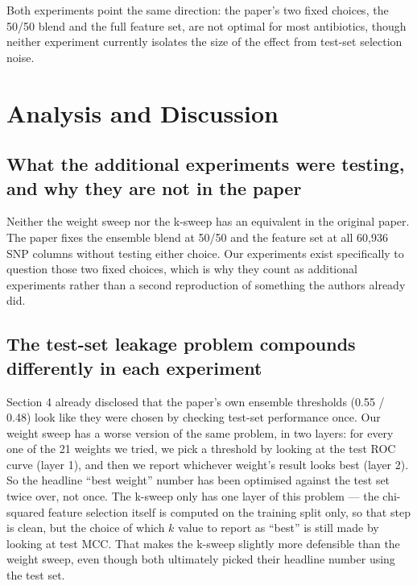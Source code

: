 \documentclass[11pt]{article}
\begin{document}
\bigskip
\noindent Both experiments point the same direction: the paper's two fixed choices, the 50/50 blend and the full feature set, are not optimal for most antibiotics, though neither experiment currently isolates the size of the effect from test-set selection noise.

\section{Analysis and Discussion}

\subsection{What the additional experiments were testing, and why they are not in the paper}

Neither the weight sweep nor the k-sweep has an equivalent in the original paper. The paper fixes the ensemble blend at 50/50 and the feature set at all 60,936 SNP columns without testing either choice. Our experiments exist specifically to question those two fixed choices, which is why they count as additional experiments rather than a second reproduction of something the authors already did.

\subsection{The test-set leakage problem compounds differently in each experiment}

Section 4 already disclosed that the paper's own ensemble thresholds (0.55 / 0.48) look like they were chosen by checking test-set performance once. Our weight sweep has a worse version of the same problem, in two layers: for every one of the 21 weights we tried, we pick a threshold by looking at the test ROC curve (layer 1), and then we report whichever weight's result looks best (layer 2). So the headline ``best weight'' number has been optimised against the test set twice over, not once. The k-sweep only has one layer of this problem --- the chi-squared feature selection itself is computed on the training split only, so that step is clean, but the choice of which $k$ value to report as ``best'' is still made by looking at test MCC. That makes the k-sweep slightly more defensible than the weight sweep, even though both ultimately picked their headline number using the test set.
\end{document}
